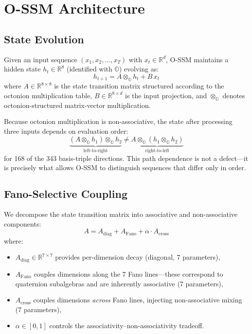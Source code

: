 \documentclass{article}
\newcommand{\Oct}{\mathbb{O}}
\newcommand{\R}{\mathbb{R}}
\begin{document}
\section{O-SSM Architecture}
\label{sec:arch}

\subsection{State Evolution}
\label{sec:state}

Given an input sequence $(x_1, x_2, \ldots, x_T)$ with $x_t \in \R^d$, O-SSM maintains a hidden state $h_t \in \R^8$ (identified with $\Oct$) evolving as:
\begin{equation}
h_{t+1} = A \otimes_{\Oct} h_t + B \, x_t
\label{eq:evolution}
\end{equation}
where $A \in \R^{8 \times 8}$ is the state transition matrix structured according to the octonion multiplication table, $B \in \R^{8 \times d}$ is the input projection, and $\otimes_{\Oct}$ denotes octonion-structured matrix-vector multiplication.

Because octonion multiplication is non-associative, the state after processing three inputs depends on evaluation order:
\begin{equation}
\underbrace{(A \otimes_\Oct h_1) \otimes_\Oct h_2}_{\text{left-to-right}} \neq \underbrace{A \otimes_\Oct (h_1 \otimes_\Oct h_2)}_{\text{right-to-left}}
\end{equation}
for 168 of the 343 basis-triple directions.
This path dependence is not a defect---it is precisely what allows O-SSM to distinguish sequences that differ only in order.

\subsection{Fano-Selective Coupling}
\label{sec:fano}

We decompose the state transition matrix into associative and non-associative components:
\begin{equation}
A = A_{\text{diag}} + A_{\text{Fano}} + \alpha \cdot A_{\text{cross}}
\label{eq:fano-selective}
\end{equation}
where:
\begin{itemize}
    \item $A_{\text{diag}} \in \R^{7 \times 7}$ provides per-dimension decay (diagonal, 7 parameters),
    \item $A_{\text{Fano}}$ couples dimensions along the 7 Fano lines---these correspond to quaternion subalgebras and are inherently associative (7 parameters),
    \item $A_{\text{cross}}$ couples dimensions \emph{across} Fano lines, injecting non-associative mixing (7 parameters),
    \item $\alpha \in [0, 1]$ controls the associativity--non-associativity tradeoff.
\end{itemize}
\end{document}
